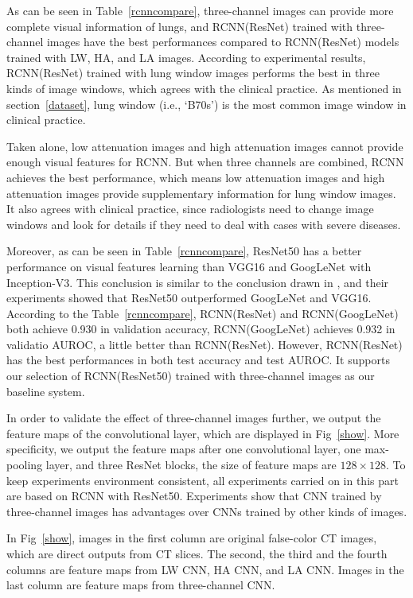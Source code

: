 \documentclass[journal]{IEEEtran}
\begin{document}
As can be seen in Table~\ref{rcnncompare}, three-channel images can provide more complete visual information of lungs, and RCNN(ResNet) trained with three-channel images have the best performances compared to RCNN(ResNet) models trained with LW, HA, and LA images.
According to experimental results, RCNN(ResNet) trained with lung window images performs the best in three kinds of image windows, which agrees with the clinical practice. As mentioned in section~\ref{dataset}, lung window (i.e., `B70s') is the most common image window in clinical practice. 

Taken alone, low attenuation images and high attenuation images cannot provide enough visual features for RCNN. But when three channels are combined, RCNN achieves the best performance, which means low attenuation images and high attenuation images provide supplementary information for lung window images. It also agrees with clinical practice, since radiologists need to change image windows and look for details if they need to deal with cases with severe diseases.

Moreover, as can be seen in Table~\ref{rcnncompare}, ResNet50 has a better performance on visual features learning than VGG16 and GoogLeNet with Inception-V3. This conclusion is similar to the conclusion drawn in \cite{Wang2017ChestX}, and their experiments showed that ResNet50 outperformed GoogLeNet and VGG16. According to the Table~\ref{rcnncompare}, RCNN(ResNet) and RCNN(GoogLeNet) both achieve 0.930 in validation accuracy, RCNN(GoogLeNet) achieves 0.932 in validatio AUROC, a little better than RCNN(ResNet). However, RCNN(ResNet) has the best performances in both test accuracy and test AUROC. It supports our selection of RCNN(ResNet50) trained with three-channel images as our baseline system.


In order to validate the effect of three-channel images further, we output the feature maps of the convolutional layer, which are displayed in Fig~\ref{show}. More specificity, we output the feature maps after one convolutional layer, one max-pooling layer, and three ResNet blocks, the size of feature maps are $128 \times 128$. To keep experiments environment consistent, all experiments carried on in this part are based on RCNN with ResNet50. Experiments show that CNN trained by three-channel images has advantages over CNNs trained by other kinds of images.

In Fig~\ref{show}, images in the first column are original false-color CT images, which are direct outputs from CT slices. The second, the third and the fourth columns are feature maps from LW CNN, HA CNN, and LA CNN. Images in the last column are feature maps from three-channel CNN.  
\end{document}
